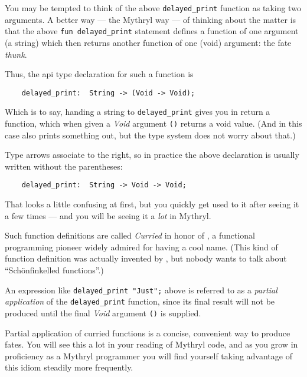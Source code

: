 You may be tempted to think of the above {\tt delayed\_print} function as 
taking two arguments.  A better way --- the Mythryl way --- of thinking 
about the matter is that the above {\tt fun delayed\_print} statement 
defines a function of one argument (a string) which then returns another 
function of one (void) argument:  the fate {\it thunk}.

Thus, the api type declaration for such a function is

\begin{verbatim}
    delayed_print:  String -> (Void -> Void);
\end{verbatim}

Which is to say, handing a string to {\tt delayed\_print} gives you 
in return a function, which when given a {\it Void} argument {\tt ()} 
returns a void value.  (And in this case also prints something out, 
but the type system does not worry about that.)

Type arrows associate to the right, so in practice the above 
declaration is usually written without the parentheses:

\begin{verbatim}
    delayed_print:  String -> Void -> Void;
\end{verbatim}

That looks a little confusing at first, but you quickly get 
used to it after seeing it a few times --- and you will be 
seeing it a {\it lot} in Mythryl. 

Such function definitions are called {\it Curried} in honor of 
, a functional programming pioneer 
widely admired for having a cool name.  (This kind of function 
definition was actually invented by 
, but nobody 
wants to talk about ``Sch\"{o}nfinkelled functions''.)

An expression like {\tt delayed\_print "Just";} above is referred to 
as a {\it partial application} of the {\tt delayed\_print} function, 
since its final result will not be produced until the final {\it Void} 
argument {\tt ()} is supplied.

Partial application of curried functions is a concise, convenient 
way to produce fates.  You will see this a lot in your 
reading of Mythryl code, and as you grow in proficiency as a 
Mythryl programmer you will find yourself taking advantage of this 
idiom steadily more frequently.

\cutend*


